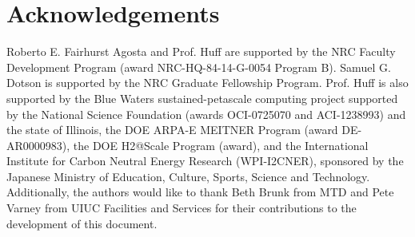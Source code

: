 \documentclass{anstrans}
\begin{document}
\section{Acknowledgements}

Roberto E. Fairhurst Agosta and Prof. Huff are supported by the \gls{NRC} Faculty Development Program (award NRC-HQ-84-14-G-0054 Program B). Samuel G. Dotson is supported by the \gls{NRC} Graduate Fellowship Program. Prof. Huff is also supported by the Blue Waters sustained-petascale computing project supported by the National Science Foundation (awards OCI-0725070 and ACI-1238993) and the state of Illinois, the DOE ARPA-E MEITNER Program (award DE-AR0000983), the DOE H2@Scale Program (award), and the International Institute for Carbon Neutral Energy Research (WPI-I2CNER), sponsored by the Japanese Ministry of Education, Culture, Sports, Science and Technology.
Additionally, the authors would like to thank Beth Brunk from \gls{MTD} and Pete Varney from \gls{UIUC} Facilities and Services for their contributions to the development of this document.



\end{document}
